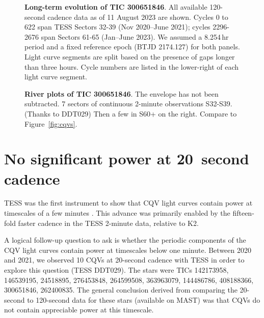 \documentclass[11pt,twocolumn,tighten]{aastex63}
\begin{document}
\begin{figure*}[!t]
	\begin{center}
	\end{center}
	\vspace{-0.4cm}
	\caption{
		{\bf Long-term evolution of TIC 300651846}.
    All available 120-second cadence data as of 11 August 2023 are shown.
    Cycles 0 to 622 span TESS Sectors 32-39 (Nov 2020--June 2021);
    cycles 2296-2676 span Sectors 61-65 (Jan--June 2023).  We assumed
    a 8.254\,hr period and a fixed reference epoch (BTJD 2174.127) for
    both panels.
    Light curve segments are split based on the presence of gaps
    longer than three hours.
    Cycle numbers are listed in the lower-right of each light curve segment.
	}
	\label{fig:tic3006timegroups}
\end{figure*}


\begin{figure*}[!t]
	\begin{center}
	\end{center}
	\vspace{-0.4cm}
	\caption{
		{\bf River plots of TIC 300651846}.
		The envelope has not been subtracted.
		7 sectors of continuous 2-minute observations S32-S39.  (Thanks to DDT029)
		Then a few in S60+ on the right.
		Compare to Figure~\ref{fig:cqvs}.
	}
	\label{fig:tic3006river}
\end{figure*}



\section{No significant power at 20~second cadence}

TESS was the first instrument to show that CQV light curves contain
power at timescales of a few minutes
\citep{127Z,2020AJ....160...86B,2022AJ....163..144G}.  This advance
was primarily enabled by the fifteen-fold faster cadence in the TESS
2-minute data, relative to K2.

A logical follow-up question to ask is whether the periodic components
of the CQV light curves contain power at timescales below one minute.
Between 2020 and 2021, we observed 10 CQVs at 20-second cadence with
TESS in order to explore this question (TESS DDT029).  The stars were
TICs 142173958, 146539195, 24518895, 276453848, 264599508, 363963079,
144486786, 408188366, 300651846, 262400835.  The general conclusion
derived from comparing the 20-second to 120-second data for these
stars (available on MAST) was that CQVs do not contain appreciable
power at this timescale.
\end{document}
